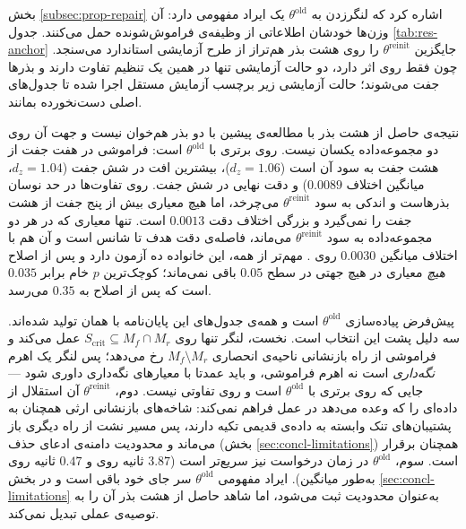 بخش \ref{subsec:prop-repair} اشاره کرد که لنگرزدن به $\theta^{\mathrm{old}}$ یک ایراد مفهومی دارد: آن وزن‌ها خودشان اطلاعاتی از وظیفه‌ی فراموش‌شونده حمل می‌کنند. جدول \ref{tab:res-anchor} جایگزین $\theta^{\mathrm{reinit}}$ را روی هشت بذر هم‌تراز از طرح آزمایشی استاندارد می‌سنجد. چون  فقط روی  اثر دارد، دو حالت آزمایشی تنها در همین یک تنظیم تفاوت دارند و بذرها جفت می‌شوند؛ حالت آزمایشی  زیر برچسب آزمایش مستقل  اجرا شده تا جدول‌های اصلی دست‌نخورده بمانند.



نتیجه‌ی حاصل از هشت بذر با مطالعه‌ی پیشین با دو بذر هم‌خوان نیست و جهت آن روی دو مجموعه‌داده یکسان نیست. روی  برتری با $\theta^{\mathrm{old}}$ است: فراموشی در هفت جفت از هشت جفت به سود آن است ($d_z = 1.06$)، بیشترین افت در شش جفت ($d_z = 1.04$، میانگین اختلاف $0.0089$) و دقت نهایی در شش جفت. روی  تفاوت‌ها در حد نوسان بذرهاست و اندکی به سود $\theta^{\mathrm{reinit}}$ می‌چرخد، اما هیچ معیاری بیش از پنج جفت از هشت جفت را نمی‌گیرد و بزرگی اختلاف دقت $0.0013$ است. تنها معیاری که در هر دو مجموعه‌داده به سود $\theta^{\mathrm{reinit}}$ می‌ماند، فاصله‌ی دقت هدف تا شانس است و آن هم با اختلاف میانگین $0.0030$ روی . مهم‌تر از همه، این خانواده ده آزمون دارد و پس از اصلاح  \emph{هیچ} معیاری در هیچ جهتی در سطح $0.05$ باقی نمی‌ماند؛ کوچک‌ترین $p$ خام برابر $0.035$ است که پس از اصلاح به $0.35$ می‌رسد.

پیش‌فرض پیاده‌سازی $\theta^{\mathrm{old}}$ است و همه‌ی جدول‌های این پایان‌نامه با همان تولید شده‌اند. سه دلیل پشت این انتخاب است. نخست، لنگر تنها روی $S_{\mathrm{crit}} \subseteq M_f \cap M_r$ عمل می‌کند و فراموشی از راه بازنشانی ناحیه‌ی انحصاری $M_f \setminus M_r$ رخ می‌دهد؛ پس لنگر یک اهرم \emph{نگه‌داری} است نه اهرم فراموشی، و باید عمدتا با معیارهای نگه‌داری داوری شود — جایی که روی  برتری با $\theta^{\mathrm{old}}$ است و روی  تفاوتی نیست. دوم، $\theta^{\mathrm{reinit}}$ آن استقلال از داده‌ای را که وعده می‌دهد در عمل فراهم نمی‌کند: شاخه‌های بازنشانی ارثی همچنان به پشتیبان‌های تنک وابسته به داده‌ی قدیمی تکیه دارند، پس مسیر نشت از راه دیگری باز می‌ماند و محدودیت دامنه‌ی ادعای حذف (بخش \ref{sec:concl-limitations}) همچنان برقرار است. سوم، $\theta^{\mathrm{old}}$ در زمان درخواست نیز سریع‌تر است ($3.87$ ثانیه روی  و $0.47$ ثانیه روی  به‌طور میانگین). ایراد مفهومی $\theta^{\mathrm{old}}$ سر جای خود باقی است و در بخش \ref{sec:concl-limitations} به‌عنوان محدودیت ثبت می‌شود، اما شاهد حاصل از هشت بذر آن را به توصیه‌ی عملی تبدیل نمی‌کند.

